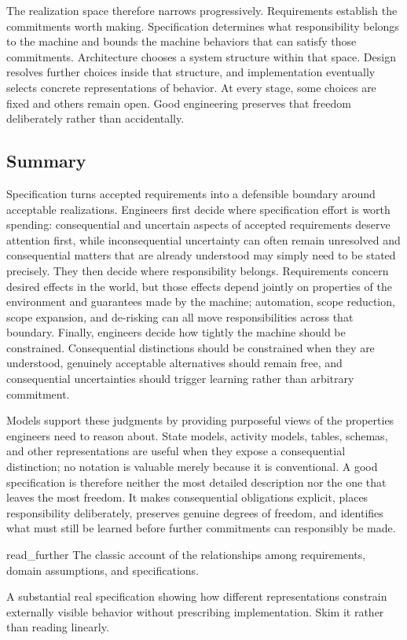 The realization space therefore narrows progressively. Requirements establish the commitments worth
making. Specification determines what responsibility belongs to the machine and bounds the machine
behaviors that can satisfy those commitments. Architecture chooses a system structure within that
space. Design resolves further choices inside that structure, and implementation eventually selects
concrete representations of behavior. At every stage, some choices are fixed and others remain
open. Good engineering preserves that freedom deliberately rather than accidentally.

\subsection{Summary}\label{summary}

Specification turns accepted requirements into a defensible boundary around acceptable
realizations. Engineers first decide where specification effort is worth spending: consequential
and uncertain aspects of accepted requirements deserve attention first, while inconsequential
uncertainty can often remain unresolved and consequential matters that are already understood may
simply need to be stated precisely. They then decide where responsibility belongs. Requirements
concern desired effects in the world, but those effects depend jointly on properties of the
environment and guarantees made by the machine; automation, scope reduction, scope expansion, and
de-risking can all move responsibilities across that boundary. Finally, engineers decide how
tightly the machine should be constrained. Consequential distinctions should be constrained when
they are understood, genuinely acceptable alternatives should remain free, and consequential
uncertainties should trigger learning rather than arbitrary commitment.

Models support these judgments by providing purposeful views of the properties engineers need to
reason about. State models, activity models, tables, schemas, and other representations are useful
when they expose a consequential distinction; no notation is valuable merely because it is
conventional. A good specification is therefore neither the most detailed description nor the one
that leaves the most freedom. It makes consequential obligations explicit, places responsibility
deliberately, preserves genuine degrees of freedom, and identifies what must still be learned
before further commitments can responsibly be made.

\begin{bookbox}{read_further}{} %
\citep{zave1997darkcorners} The classic account of the relationships among requirements, domain assumptions, and specifications.

\citep{alspaugh1992a7e} A substantial real specification showing how different representations constrain externally visible behavior without prescribing implementation. Skim it rather than reading linearly.
\end{bookbox}
